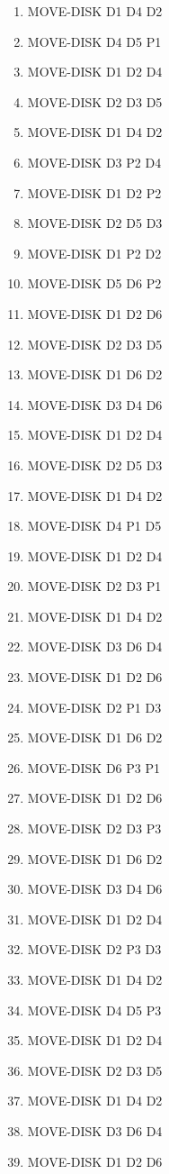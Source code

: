 \documentclass[12pt]{article}
\begin{document}
\begin{appendix}
\begin{itemize}
\begin{enumerate}
	\item  MOVE-DISK D1 D4 D2
	\item  MOVE-DISK D4 D5 P1
	\item  MOVE-DISK D1 D2 D4
	\item  MOVE-DISK D2 D3 D5
	\item  MOVE-DISK D1 D4 D2
	\item  MOVE-DISK D3 P2 D4
	\item  MOVE-DISK D1 D2 P2
	\item  MOVE-DISK D2 D5 D3
	\item  MOVE-DISK D1 P2 D2
	\item  MOVE-DISK D5 D6 P2
	\item  MOVE-DISK D1 D2 D6
	\item  MOVE-DISK D2 D3 D5
	\item  MOVE-DISK D1 D6 D2
	\item  MOVE-DISK D3 D4 D6
	\item  MOVE-DISK D1 D2 D4
	\item  MOVE-DISK D2 D5 D3
	\item  MOVE-DISK D1 D4 D2
	\item  MOVE-DISK D4 P1 D5
	\item  MOVE-DISK D1 D2 D4
	\item  MOVE-DISK D2 D3 P1
	\item  MOVE-DISK D1 D4 D2
	\item  MOVE-DISK D3 D6 D4
	\item  MOVE-DISK D1 D2 D6
	\item  MOVE-DISK D2 P1 D3
	\item  MOVE-DISK D1 D6 D2
	\item  MOVE-DISK D6 P3 P1
	\item  MOVE-DISK D1 D2 D6
	\item  MOVE-DISK D2 D3 P3
	\item  MOVE-DISK D1 D6 D2
	\item  MOVE-DISK D3 D4 D6
	\item  MOVE-DISK D1 D2 D4
	\item  MOVE-DISK D2 P3 D3
	\item  MOVE-DISK D1 D4 D2
	\item  MOVE-DISK D4 D5 P3
	\item  MOVE-DISK D1 D2 D4
	\item  MOVE-DISK D2 D3 D5
	\item  MOVE-DISK D1 D4 D2
	\item  MOVE-DISK D3 D6 D4
	\item  MOVE-DISK D1 D2 D6

\end{enumerate}
\end{itemize}
\end{appendix}
\end{document}

